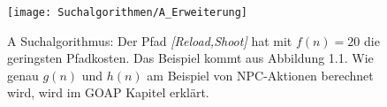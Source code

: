 \begin{figure}[h]
  \centering
  \texttt{[image: Suchalgorithmen/A\_Erweiterung]}
	\captionsetup{justification=justified, format=plain}
  \caption{A Suchalgorithmus: Der Pfad \textit{[Reload,Shoot]} hat mit $f(n)=20$ die geringsten Pfadkosten. Das Beispiel kommt aus  Abbildung 1.1. Wie genau $g(n)$ und $h(n)$ am Beispiel von NPC-Aktionen berechnet wird, wird im GOAP Kapitel erklärt.}
  \label{Suchalgorithmen}
\end{figure}